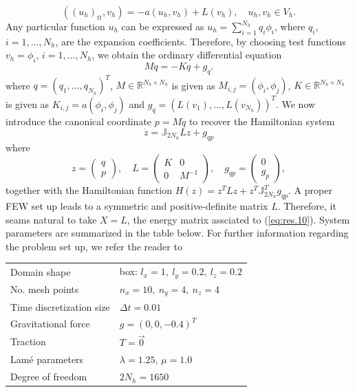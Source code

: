 \begin{equation} \label{eq:res.8}
	((u_h)_{tt},v_h) = - a(u_h,v_h) + L(v_h),\quad u_h,v_h\in V_h.
\end{equation}
Any particular function $u_h$ can be expressed as $u_h = \sum_{i=1}^{N_h} q_i \phi_i$, where $q_i$, $i=1,\dots,N_h$, are the expansion coefficients. Therefore, by choosing test functions $v_h = \phi_i$, $i=1,\dots,N_h$, we obtain the ordinary differential equation
\begin{equation} \label{eq:res.9}
	M\ddot q = -K q + g_{q}.
\end{equation}
where $q=(q_1,\dots,q_{N_h})^T$, $M\in \mathbb R^{N_h\times N_h}$ is given as $M_{i,j} = (\phi_i,\phi_j)$, $K\in \mathbb R^{N_h\times N_h}$ is given as $K_{i,j} = a(\phi_i,\phi_j)$ and $g_q=(L(v_1),\dots,L(v_{N_h}))^T$. We now introduce the canonical coordinate $p = M\dot q$ to recover the Hamiltonian system
\begin{equation} \label{eq:res.10}
	\dot z = \mathbb J_{2N_h} Lz + g_{qp}
\end{equation}
where
\begin{equation} \label{eq:res.11}
	z = 
	\begin{pmatrix}
	q \\
	p	
	\end{pmatrix}, \quad 
	L = 
	\begin{pmatrix}
	K & 0 \\
	0 & M^{-1}
	\end{pmatrix}, \quad
	g_{qp} =
	\begin{pmatrix}
	0 \\
	g_p
	\end{pmatrix},
\end{equation}
together with the Hamiltonian function $H(z) = z^TLz + z^T \mathbb J_{2N_h}^T g_{qp}$. A proper FEW set up leads to a symmetric and positive-definite matrix $L$. Therefore, it seams natural to take $X=L$, the energy matrix assciated to (\ref{eq:res.10}). System parameters are summarized in the table below. For further information regarding the problem set up, we refer the reader to \cite{langtangen2017solving}

\vspace{0.5cm}
\begin{center}
\begin{tabular}{|l|l|}
\hline
Domain shape & box: $l_x = 1,\ l_y = 0.2,\ l_z = 0.2$ \\
No. mesh points & $n_x = 10,\ n_y = 4,\ n_z = 4$ \\
Time discretization size & $\Delta t = 0.01$ \\
Gravitational force & $g = (0,0,-0.4)^T$ \\
Traction & $T = \vec 0$ \\
Lam\'e parameters & $\lambda = 1.25$, $\mu = 1.0$ \\
Degree of freedom & $2N_{h} = 1650$ \\
\hline
\end{tabular}
\end{center}
\vspace{0.5cm}

